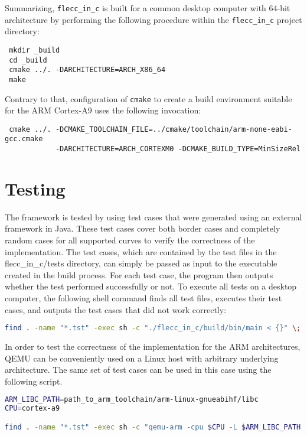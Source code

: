 \documentclass[runningheads]{llncs}
\begin{document}
Summarizing, \texttt{flecc\_in\_c} is built for a common desktop computer with 64-bit architecture by performing the following procedure within the \texttt{flecc\_in\_c} project directory:

\begin{verbatim}
 mkdir _build
 cd _build
 cmake ../. -DARCHITECTURE=ARCH_X86_64
 make 
\end{verbatim}

Contrary to that, configuration of \texttt{cmake} to create a build environment suitable for the ARM Cortex-A9 uses the following invocation:

\begin{verbatim}
 cmake ../. -DCMAKE_TOOLCHAIN_FILE=../cmake/toolchain/arm-none-eabi-gcc.cmake 
            -DARCHITECTURE=ARCH_CORTEXM0 -DCMAKE_BUILD_TYPE=MinSizeRel
\end{verbatim}


\section{Testing}

The framework is tested by using test cases that were generated using an external framework in Java. These test cases cover both border cases and completely random cases for all supported curves to verify the correctness of the implementation. The test cases, which are contained by the test files in the flecc\_in\_c/tests directory, can simply be passed as input to the executable created in the build process. For each test case, the program then outputs whether the test performed successfully or not. To execute all tests on a desktop computer, the following shell command finds all test files, executes their test cases, and outputs the test cases that did not work correctly:

\begin{lstlisting}[language=bash,basicstyle=\footnotesize\ttfamily,breaklines=true]
find . -name "*.tst" -exec sh -c "./flecc_in_c/build/bin/main < {}" \; | grep -v success
\end{lstlisting}

In order to test the correctness of the implementation for the ARM architectures, QEMU can be conveniently used on a Linux host with arbitrary underlying architecture. The same set of test cases can be used in this case using the following script.

\begin{lstlisting}[language=bash,basicstyle=\footnotesize\ttfamily,breaklines=true]
ARM_LIBC_PATH=path_to_arm_toolchain/arm-linux-gnueabihf/libc
CPU=cortex-a9

find . -name "*.tst" -exec sh -c "qemu-arm -cpu $CPU -L $ARM_LIBC_PATH ./flecc_in_c/build/bin/main < {}" \; | grep -v success
\end{lstlisting}



%

%


\appendix
%
\end{document}
